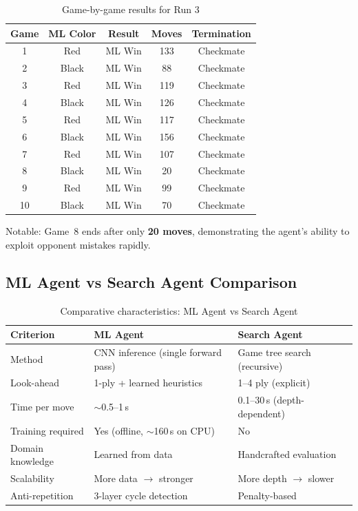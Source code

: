 \documentclass[a4paper,12pt]{article}
\begin{document}
\begin{table}[H]
\centering
\caption{Game-by-game results for Run 3}
\begin{tabular}{@{}ccccc@{}}
\toprule
\textbf{Game} & \textbf{ML Color} & \textbf{Result} & \textbf{Moves} & \textbf{Termination} \\
\midrule
1 & Red & ML Win & 133 & Checkmate \\
2 & Black & ML Win & 88 & Checkmate \\
3 & Red & ML Win & 119 & Checkmate \\
4 & Black & ML Win & 126 & Checkmate \\
5 & Red & ML Win & 117 & Checkmate \\
6 & Black & ML Win & 156 & Checkmate \\
7 & Red & ML Win & 107 & Checkmate \\
8 & Black & ML Win & 20 & Checkmate \\
9 & Red & ML Win & 99 & Checkmate \\
10 & Black & ML Win & 70 & Checkmate \\
\bottomrule
\end{tabular}
\end{table}

Notable: Game~8 ends after only \textbf{20 moves}, demonstrating the agent's ability to exploit opponent mistakes rapidly.

\subsection{ML Agent vs Search Agent Comparison}

\begin{table}[H]
\centering
\caption{Comparative characteristics: ML Agent vs Search Agent}
\begin{tabularx}{\textwidth}{@{}lXX@{}}
\toprule
\textbf{Criterion} & \textbf{ML Agent} & \textbf{Search Agent} \\
\midrule
Method & CNN inference (single forward pass) & Game tree search (recursive) \\
Look-ahead & 1-ply + learned heuristics & 1--4 ply (explicit) \\
Time per move & $\sim$0.5--1\,s & 0.1--30\,s (depth-dependent) \\
Training required & Yes (offline, $\sim$160\,s on CPU) & No \\
Domain knowledge & Learned from data & Handcrafted evaluation \\
Scalability & More data $\to$ stronger & More depth $\to$ slower \\
Anti-repetition & 3-layer cycle detection & Penalty-based \\
\bottomrule
\end{tabularx}
\end{table}
\end{document}
